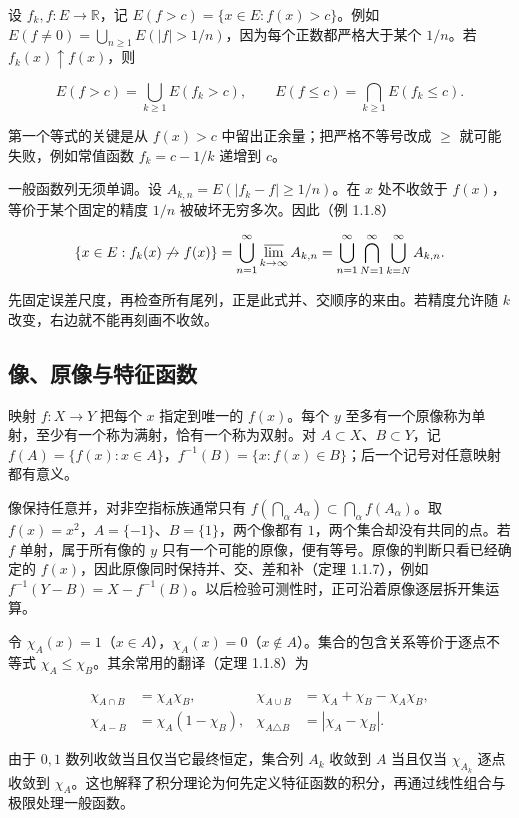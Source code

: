 \documentclass[11pt,a4paper]{article}
\begin{document}
设 \(f_k,f:E\to\mathbb R\)，记 \(E(f>c)=\{x\in E:f(x)>c\}\)。例如 \(E(f\ne0)=\bigcup_{n\ge1}E(|f|>1/n)\)，因为每个正数都严格大于某个 \(1/n\)。若 \(f_k(x)\uparrow f(x)\)，则

\[
E(f>c)=\bigcup_{k\ge1}E(f_k>c),\qquad
E(f\le c)=\bigcap_{k\ge1}E(f_k\le c).
\]

第一个等式的关键是从 \(f(x)>c\) 中留出正余量；把严格不等号改成 \(\ge\) 就可能失败，例如常值函数 \(f_k=c-1/k\) 递增到 \(c\)。

一般函数列无须单调。设 \(A_{k,n}=E(|f_k-f|\ge1/n)\)。在 \(x\) 处不收敛于 \(f(x)\)，等价于某个固定的精度 \(1/n\) 被破坏无穷多次。因此（例 1.1.8）

\[
\{x\in E:f_k(x)\not\to f(x)\}
=\bigcup_{n=1}^{\infty}\varlimsup_{k\to\infty} A_{k,n}
=\bigcup_{n=1}^{\infty}\bigcap_{N=1}^{\infty}\bigcup_{k=N}^{\infty} A_{k,n}.
\]

先固定误差尺度，再检查所有尾列，正是此式并、交顺序的来由。若精度允许随 \(k\) 改变，右边就不能再刻画不收敛。

\subsection{像、原像与特征函数}

映射 \(f:X\to Y\) 把每个 \(x\) 指定到唯一的 \(f(x)\)。每个 \(y\) 至多有一个原像称为单射，至少有一个称为满射，恰有一个称为双射。对 \(A\subset X\)、\(B\subset Y\)，记 \(f(A)=\{f(x):x\in A\}\)，\(f^{-1}(B)=\{x:f(x)\in B\}\)；后一个记号对任意映射都有意义。

像保持任意并，对非空指标族通常只有 \(f(\bigcap_\alpha A_\alpha)\subset\bigcap_\alpha f(A_\alpha)\)。取 \(f(x)=x^2\)，\(A=\{-1\}\)、\(B=\{1\}\)，两个像都有 \(1\)，两个集合却没有共同的点。若 \(f\) 单射，属于所有像的 \(y\) 只有一个可能的原像，便有等号。原像的判断只看已经确定的 \(f(x)\)，因此原像同时保持并、交、差和补（定理 1.1.7），例如 \(f^{-1}(Y-B)=X-f^{-1}(B)\)。以后检验可测性时，正可沿着原像逐层拆开集运算。

令 \(\chi_A(x)=1\)（\(x\in A\)），\(\chi_A(x)=0\)（\(x\notin A\)）。集合的包含关系等价于逐点不等式 \(\chi_A\le\chi_B\)。其余常用的翻译（定理 1.1.8）为

\[
\begin{aligned}
\chi_{A\cap B}&=\chi_A\chi_B,&
\chi_{A\cup B}&=\chi_A+\chi_B-\chi_A\chi_B,\\
\chi_{A-B}&=\chi_A(1-\chi_B),&
\chi_{A\triangle B}&=|\chi_A-\chi_B|.
\end{aligned}
\]

由于 \(0,1\) 数列收敛当且仅当它最终恒定，集合列 \(A_k\) 收敛到 \(A\) 当且仅当 \(\chi_{A_k}\) 逐点收敛到 \(\chi_A\)。这也解释了积分理论为何先定义特征函数的积分，再通过线性组合与极限处理一般函数。
\end{document}
